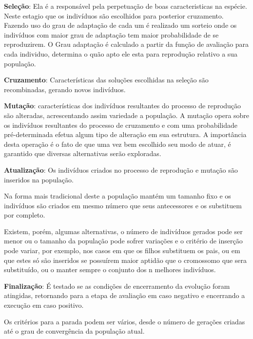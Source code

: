 \textbf{Seleção}: Ela é a responsável pela perpetuação de boas caracteristicas na espécie. 
Neste estagio que os indivíduos são escolhidos para posterior cruzamento. Fazendo uso do grau de adaptação de cada um é realizado um sorteio onde os indivíduos com maior grau de adaptação tem maior probabilidade de se reproduzirem.
O Grau adaptação é calculado a partir da função de avaliação para cada individuo, determina o quão apto ele esta para reprodução relativo a sua população. 


\textbf{Cruzamento}: Características das soluções escolhidas na seleção são recombinadas, gerando novos indivíduos.


\textbf{Mutação}: características dos indivíduos resultantes do processo de reprodução são alteradas, acrescentando assim variedade a população.
A mutação opera sobre os indivíduos resultantes do processo de cruzamento e com uma probabilidade pré-determinada efetua algum tipo de alteração em sua  estrutura. A importância desta operação é o fato de que uma vez bem escolhido seu modo de atuar, é garantido que diversas alternativas serão exploradas.
 
\textbf{Atualização}: Os indivíduos criados no processo de reprodução e mutação são inseridos na população.

Na forma mais tradicional deste a população mantém um tamanho fixo e os indivíduos são criados em mesmo número que seus antecessores e os substituem por completo. 

Existem, porém, algumas alternativas, o número de indivíduos gerados pode ser menor ou o tamanho da população pode sofrer variações e o critério de inserção pode variar, por exemplo, nos casos em que os filhos substituem os pais, ou em que estes só são inseridos se possuírem maior aptidão que o cromossomo que sera substituído, ou o manter sempre o conjunto dos n melhores indivíduos. 


\textbf{Finalização}: É testado se as condições de encerramento da evolução foram atingidas, retornando para a etapa de avaliação em caso negativo e encerrando a execução em caso positivo.

Os critérios para a parada podem ser vários, desde o número de gerações criadas até o grau de convergência da população atual.

